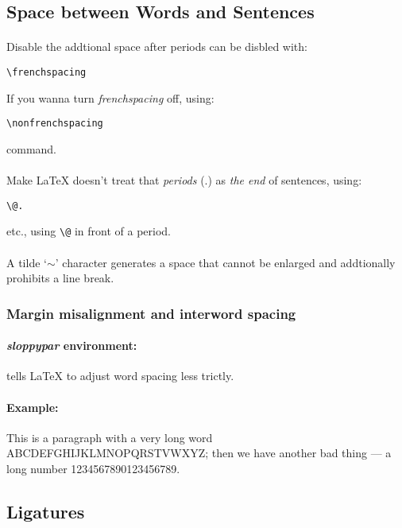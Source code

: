 \documentclass[11pt,a4paper]{article}
\begin{document}
\subsection{Space between Words and Sentences}

\paragraph{}
Disable the addtional space after periods can be disbled with:
\begin{verbatim}
\frenchspacing
\end{verbatim}
If you wanna turn \emph{frenchspacing} off, using:
\begin{verbatim}
\nonfrenchspacing
\end{verbatim}
command.

\paragraph{}
Make \LaTeX{} doesn't treat that \emph{periods} (.) as \emph{the end} of sentences, using:
\begin{verbatim}
\@.
\end{verbatim}
etc., using \verb|\@| in front of a period.
\paragraph{}
A tilde `$\sim$' character generates a space that cannot be enlarged and addtionally
prohibits a line break.

\subsubsection{Margin misalignment and interword spacing}
\paragraph{\emph{sloppypar} environment:} tells \LaTeX{} to adjust word spacing less trictly.
\paragraph{Example:}
\begin{sloppypar}
This is a paragraph with a very long word ABCDEFGHIJKLMNOPQRSTVWXYZ; then we have another bad thing
--- a long number 1234567890123456789.
\end{sloppypar}

\subsection{Ligatures}
\end{document}
